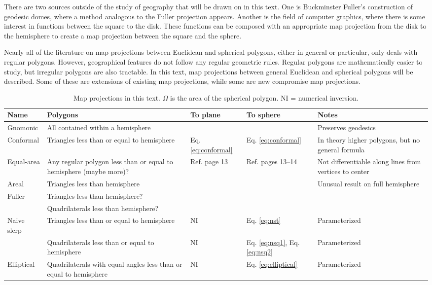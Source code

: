 \documentclass{amsart}[12pt]
\begin{document}
There are two sources outside of the study of geography that will be drawn on
in this text. One is Buckminster Fuller's construction of geodesic domes, where
a method analogous to the Fuller projection appears.\cite{kenner} Another is
the field of computer graphics, where there is some interest in functions
between the square to the disk.\cite{fong15}\cite{fong18}
These functions can be composed with an appropriate map
projection from the disk to the hemisphere
to create a map projection between the square and the sphere.\cite{lambers}

Nearly all of the literature on map projections between Euclidean and spherical
polygons, either in general or particular, only deals with regular polygons.
However, geographical features do not follow any regular geometric rules.
Regular polygons are mathematically easier to study, but irregular polygons are
also tractable. In this text, map projections between general Euclidean and
spherical polygons will be described. Some of these are extensions of existing
map projections, while some are new compromise map projections.

\begin{table}
\begin{tabular}[]{l|p{4.5cm}p{1.4cm}p{1.4cm}p{5cm}}
  Name & Polygons & To plane & To sphere & Notes \\
  \hline
  Gnomonic & All contained within a hemisphere & & & Preserves geodesics \\
  \hline
  Conformal & Triangles less than or equal to hemisphere & Eq. \ref{eq:conformal} &
    Eq. \ref{eq:conformal} & In theory higher polygons, but no general formula\\
  \hline
  Equal-area & Any regular polygon less than or equal to hemisphere (maybe more)? &
  Ref. \cite{snyder92} page 13 & Ref. \cite{snyder92} pages 13--14&
    Not differentiable along lines from vertices to center \\
  \hline
  Areal & Triangles less than hemisphere & & &
    Unusual result on full hemisphere\\
  \hline
  Fuller & Triangles less than hemisphere? & &
    & \cite{kenner}\cite{gray94}\cite{gray95}\\
  & Quadrilaterals less than hemisphere? & & & \\
  \hline
  Naive slerp & Triangles less than or equal to hemisphere & NI &
  Eq. \ref{eq:nst}  & Parameterized\\
  & Quadrilaterals less than or equal to hemisphere & NI &
    Eq. \ref{eq:nsq1}, Eq. \ref{eq:nsq2} & Parameterized\\
  \hline
  Elliptical & Quadrilaterals with equal angles less than or equal to
    hemisphere &    NI & Eq. \ref{eq:elliptical}& Parameterized
\end{tabular}
\caption{Map projections in this text. $\Omega$ is the area of the spherical
polygon. NI = numerical inversion.}
\label{fig:projs}
\end{table}
\end{document}

